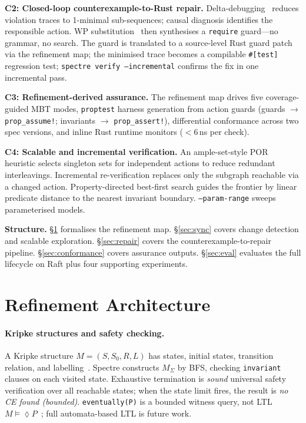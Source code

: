 \documentclass[runningheads]{../paper-vmcai-2027/llncs}
\begin{document}
\smallskip\noindent\textbf{C2: Closed-loop counterexample-to-Rust repair.}
Delta-debugging~\cite{26_zeller2002simplifying} reduces violation traces to
1-minimal sub-sequences; causal diagnosis identifies the responsible action.
WP substitution~\cite{7_dijkstra1976discipline} then synthesises a
\texttt{require} guard---no grammar, no search.
The guard is translated to a source-level Rust guard patch via the refinement
map; the minimised trace becomes a compilable \texttt{\#[test]} regression test;
\texttt{spectre verify --incremental} confirms the fix in one incremental pass.

\smallskip\noindent\textbf{C3: Refinement-derived assurance.}
The refinement map drives five coverage-guided MBT modes, \texttt{proptest}
harness generation from action guards (guards $\to$ \texttt{prop\_assume!};
invariants $\to$ \texttt{prop\_assert!}), differential conformance across
two spec versions, and inline Rust runtime monitors ($<$6\,ns per check).

\smallskip\noindent\textbf{C4: Scalable and incremental verification.}
An ample-set-style POR heuristic selects singleton sets for independent
actions to reduce redundant interleavings.
Incremental re-verification replaces only the subgraph reachable via a changed
action.
Property-directed best-first search guides the frontier by linear predicate
distance to the nearest invariant boundary.
\texttt{--param-range} sweeps parameterised models.

\smallskip\noindent\textbf{Structure.}
\S\ref{sec:arch} formalises the refinement map.
\S\ref{sec:sync} covers change detection and scalable exploration.
\S\ref{sec:repair} covers the counterexample-to-repair pipeline.
\S\ref{sec:conformance} covers assurance outputs.
\S\ref{sec:eval} evaluates the full lifecycle on Raft plus four supporting experiments.

\section{Refinement Architecture}\label{sec:arch}

\paragraph{Kripke structures and safety checking.}
A Kripke structure $M=(S,S_0,R,L)$ has states, initial states, transition
relation, and labelling~\cite{5_clarke1986automatic}.
Spectre constructs $M_\Sigma$ by BFS, checking \texttt{invariant} clauses on
each visited state.
Exhaustive termination is \emph{sound} universal safety verification over all
reachable states; when the state limit fires, the result is
\emph{no CE found (bounded)}.
\texttt{eventually(P)} is a bounded witness query, not LTL
$M\models\lozenge P$~\cite{23_pnueli1977temporal}; full automata-based LTL
is future work.
\end{document}
